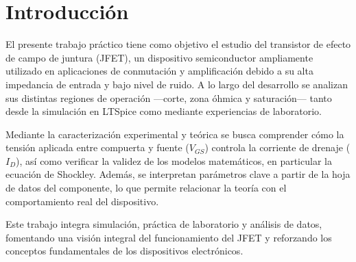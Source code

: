 \chapter{Introducción}
El presente trabajo práctico tiene como objetivo el estudio del transistor de efecto de campo de juntura (JFET), un
dispositivo semiconductor ampliamente utilizado en aplicaciones de conmutación y amplificación debido a su alta
impedancia de entrada y bajo nivel de ruido. A lo largo del desarrollo se analizan sus distintas regiones de operación
—corte, zona óhmica y saturación— tanto desde la simulación en LTSpice como mediante experiencias de laboratorio.

Mediante la caracterización experimental y teórica se busca comprender cómo la tensión aplicada entre compuerta y fuente
($V_{GS}$) controla la corriente de drenaje ($I_D$), así como verificar la validez de los modelos matemáticos, en
particular la ecuación de Shockley. Además, se interpretan parámetros clave a partir de la hoja de datos del componente,
lo que permite relacionar la teoría con el comportamiento real del dispositivo.

Este trabajo integra simulación, práctica de laboratorio y análisis de datos, fomentando una visión integral del
funcionamiento del JFET y reforzando los conceptos fundamentales de los dispositivos electrónicos.
